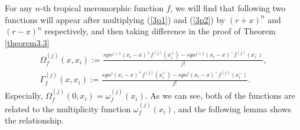 \documentclass{article}
\begin{document}
For any $n$-th tropical meromorphic function $f$, we will find that following two functions will appear after multiplying (\ref{3p1}) and (\ref{3p2}) by $(r+x)^{n}$ and $(r-x)^{n}$ respectively, and then taking difference in the proof of Theorem \ref{theorem3.3}
\begin{eqnarray*}
    \Omega_{f}^{(j)}(x, x_{i}):=\frac{sgn^{j+1}(x_{i}-x)^{+}f^{(j)}(x_{i}^{+})-sgn^{j+1}(x_{i}-x)^{-}f^{(j)}(x_{i}^{-})}{j!},\\
    \Gamma_{f}^{(j)}(x, x_{i}):=\frac{sgn^{j}(x_{i}-x)^{+}f^{(j)}(x_{i}^{+})-sgn^{j}(x_{i}-x)^{-}f^{(j)}(x_{i}^{-})}{j!}.
\end{eqnarray*}
Especially, $\Omega_{f}^{(j)}(0, x_{i})=\omega_{f}^{(j)}(x_{i})$. As we can see, both of the functions are related to the multiplicity function $\omega_{f}^{(j)}(x_{i})$, and the following lemma shows the relationship.
\end{document}
